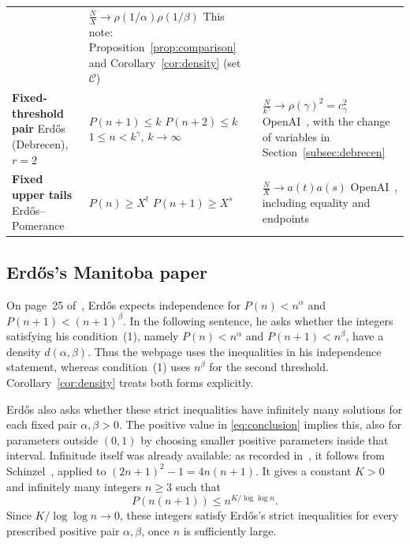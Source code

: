\documentclass[11pt,a4paper]{amsart}
\newcommand{\C}{\mathcal C}
\begin{document}
\begin{table}[htbp]
\begin{tabularx}{\textwidth}{@{}L{43mm}L{45mm}Y@{}}
 & $\displaystyle\frac{N}{X}\to\rho(1/\alpha)\rho(1/\beta)$\newline
   This note: Proposition~\ref{prop:comparison} and
   Corollary~\ref{cor:density} (set $\C$)\\[5pt]
\textbf{Fixed-threshold pair}\newline
Erd\H{o}s (Debrecen), $r=2$
\cite[pp.~272--273]{Erdos1976Debrecen}
 & $P(n+1)\le k$\newline
   $P(n+2)\le k$\newline
   $1\le n<k^\gamma$, $k\to\infty$
 & $\displaystyle\frac{N}{k^\gamma}\to\rho(\gamma)^2=c_\gamma^2$\newline
   OpenAI~\cite[(11.7), p.~80]{OpenAI2026}, with the
   change of variables in Section~\ref{subsec:debrecen}\\[5pt]
\textbf{Fixed upper tails}\newline
Erd\H{o}s--Pomerance~\cite[p.~311]{ErdosPomerance1978}
 & $P(n)\ge X^t$\newline
   $P(n+1)\ge X^s$
 & $\displaystyle\frac{N}{X}\to a(t)a(s)$\newline
   OpenAI~\cite[(11.8) and following paragraph, p.~80]{OpenAI2026},
   including equality and endpoints\\
\bottomrule
\end{tabularx}
\end{table}

\subsection{Erd\H{o}s's Manitoba paper}
On page~25 of~\cite{Erdos1976Manitoba}, Erd\H{o}s expects independence
for $P(n)<n^\alpha$ and $P(n+1)<(n+1)^\beta$. In the following sentence,
he asks whether the integers satisfying his condition~(1), namely
$P(n)<n^\alpha$ and $P(n+1)<n^\beta$, have a density $d(\alpha,\beta)$.
Thus the webpage uses the inequalities in his independence statement,
whereas condition~(1) uses $n^\beta$ for the second threshold.
Corollary~\ref{cor:density} treats both forms explicitly.

Erd\H{o}s also asks whether these strict inequalities have infinitely
many solutions for each fixed pair $\alpha,\beta>0$. The positive value in
\eqref{eq:conclusion} implies this, also for parameters outside $(0,1)$
by choosing smaller positive parameters inside that interval.
Infinitude itself was already available: as recorded in~\cite{Bloom928},
it follows from Schinzel~\cite[Theorem~14, p.~231]{Schinzel1967}, applied
to $(2n+1)^2-1=4n(n+1)$. It gives a constant $K>0$ and infinitely many
integers $n\ge3$ such that
\[
 P(n(n+1))\le n^{K/\log\log n}.
\]
Since $K/\log\log n\to0$, these integers satisfy Erd\H{o}s's strict
inequalities for every prescribed positive pair $\alpha,\beta$, once
$n$ is sufficiently large.
\end{document}
